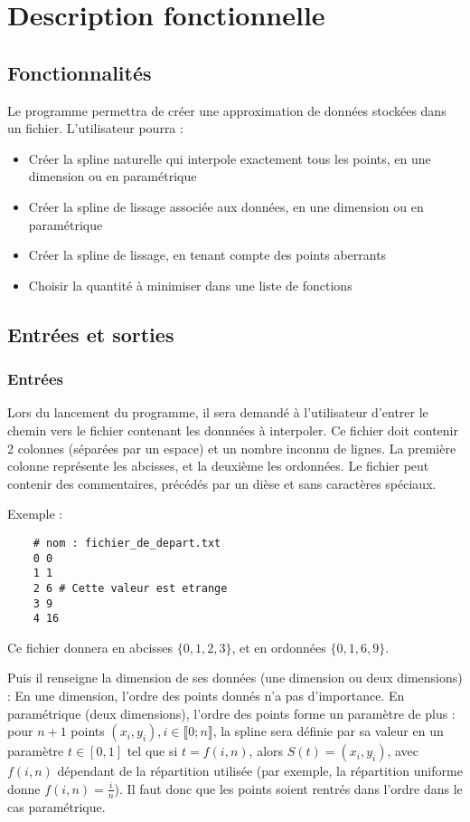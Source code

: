 \documentclass[a4paper,12pt]{article}
\begin{document}
\section{Description fonctionnelle}

\subsection{Fonctionnalités}
\label{Fonctions}

Le programme permettra de créer une approximation de données stockées dans un fichier. L'utilisateur pourra :
\begin{itemize}
\item Créer la spline naturelle qui interpole exactement tous les points, en une dimension ou en paramétrique
\item Créer la spline de lissage associée aux données, en une dimension ou en paramétrique
\item Créer la spline de lissage, en tenant compte des points aberrants
\item Choisir la quantité à minimiser dans une liste de fonctions
\end{itemize}

\newpage
\subsection{Entrées et sorties}

\subsubsection{Entrées}

Lors du lancement du programme, il sera demandé à l'utilisateur d'entrer le chemin vers le fichier contenant les donnnées à interpoler.
Ce fichier doit contenir 2 colonnes (séparées par un espace) et un nombre inconnu de lignes. La première colonne représente les abcisses, et la deuxième les ordonnées. Le fichier peut contenir des commentaires, précédés par un dièse et sans caractères spéciaux.

Exemple :

\begin{lstlisting}
    # nom : fichier_de_depart.txt
    0 0
    1 1
    2 6 # Cette valeur est etrange
    3 9
    4 16
\end{lstlisting}

Ce fichier donnera en abcisses  $\{0,1,2,3\}$, et en ordonnées $\{0,1,6,9\}$.

Puis il renseigne la dimension de ses données (une dimension ou deux dimensions) : En une dimension, l'ordre des points donnés n'a pas d'importance. En paramétrique (deux dimensions), l'ordre des points forme un paramètre de plus : pour $n+1$ points $(x_i,y_i),i\in \llbracket 0; n \rrbracket$, la spline sera définie par sa valeur en un paramètre $t \in [0,1]$ tel que si $t = f(i,n) $, alors $S(t) = (x_i,y_i)$, avec $f(i,n)$ dépendant de la répartition utilisée (par exemple, la répartition uniforme donne $f(i,n) = \frac{i}{n}$). Il faut donc que les points soient rentrés dans l'ordre dans le cas paramétrique.
\end{document}
